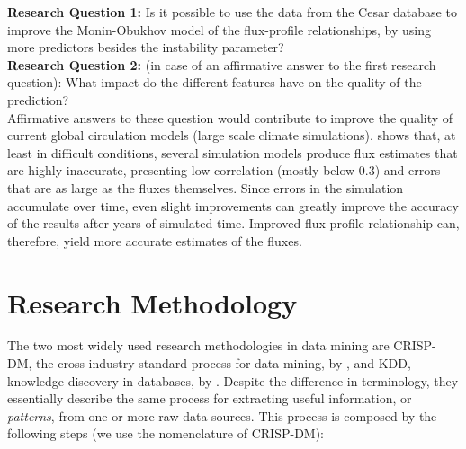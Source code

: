 \documentclass[a4paper]{book}
\begin{document}
\textbf{Research Question 1:} Is it possible to use the data from the Cesar database to improve the Monin-Obukhov model of the flux-profile relationships, by using more predictors besides the instability parameter? \\

\textbf{Research Question 2:} (in case of an affirmative answer to the first research question): What impact do the different features have on the quality of the prediction? \\

Affirmative answers to these question would contribute to improve the quality of current global circulation models (large scale climate simulations). \cite{sheba} shows that, at least in difficult conditions, several simulation models produce flux estimates that are highly inaccurate, presenting low correlation (mostly below 0.3) and errors that are as large as the fluxes themselves. Since errors in the simulation accumulate over time, even slight improvements can greatly improve the accuracy of the results after years of simulated time. Improved flux-profile relationship can, therefore, yield more accurate estimates of the fluxes.

\section{Research Methodology}
\label{sec:research_methodology}
The two most widely used research methodologies in data mining are CRISP-DM, the cross-industry standard process for data mining, by \cite{crispdm}, and KDD, knowledge discovery in databases, by \cite{kdd}. Despite the difference in terminology, they essentially describe the same process for extracting useful information, or \emph{patterns}, from one or more raw data sources. This process is composed by the following steps (we use the nomenclature of CRISP-DM):
\end{document}
